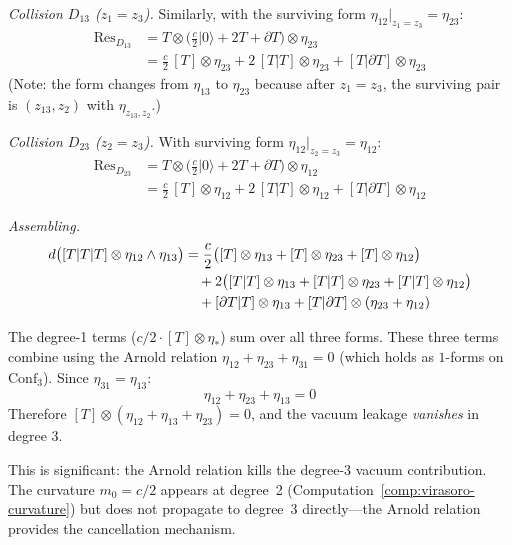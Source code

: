 \begin{computation}
\emph{Collision $D_{13}$ ($z_1 = z_3$).}
Similarly, with the surviving form $\eta_{12}|_{z_1=z_3} = \eta_{23}$:
\begin{align*}
\operatorname{Res}_{D_{13}} &= T \otimes \bigl(\tfrac{c}{2}|0\rangle + 2T + \partial T\bigr)
\otimes \eta_{23} \\
&= \frac{c}{2}\,[T] \otimes \eta_{23}
+ 2\,[T|T] \otimes \eta_{23}
+ [T|\partial T] \otimes \eta_{23}
\end{align*}
(Note: the form changes from $\eta_{13}$ to $\eta_{23}$ because after
$z_1 = z_3$, the surviving pair is $(z_{13}, z_2)$ with $\eta_{z_{13},z_2}$.)

\emph{Collision $D_{23}$ ($z_2 = z_3$).}
With surviving form $\eta_{12}|_{z_2=z_3} = \eta_{12}$:
\begin{align*}
\operatorname{Res}_{D_{23}} &= T \otimes \bigl(\tfrac{c}{2}|0\rangle + 2T + \partial T\bigr)
\otimes \eta_{12} \\
&= \frac{c}{2}\,[T] \otimes \eta_{12}
+ 2\,[T|T] \otimes \eta_{12}
+ [T|\partial T] \otimes \eta_{12}
\end{align*}

\emph{Assembling.}
\begin{align}
d\bigl([T|T|T] \otimes \eta_{12}\wedge\eta_{13}\bigr)
&= \frac{c}{2}\bigl([T] \otimes \eta_{13}
+ [T] \otimes \eta_{23}
+ [T] \otimes \eta_{12}\bigr) \notag \\
&\quad + 2\bigl([T|T] \otimes \eta_{13}
+ [T|T] \otimes \eta_{23}
+ [T|T] \otimes \eta_{12}\bigr) \notag \\
&\quad + [\partial T|T] \otimes \eta_{13}
+ [T|\partial T] \otimes (\eta_{23} + \eta_{12})
\label{eq:vir-deg3-TTT}
\end{align}

The degree-1 terms ($c/2 \cdot [T] \otimes \eta_*$) sum over all three
forms.  These three terms combine using the Arnold relation
$\eta_{12} + \eta_{23} + \eta_{31} = 0$ (which holds as $1$-forms on
$\mathrm{Conf}_3$).  Since $\eta_{31} = \eta_{13}$:
\[
\eta_{12} + \eta_{23} + \eta_{13} = 0
\]
Therefore $[T] \otimes (\eta_{12} + \eta_{13} + \eta_{23}) = 0$, and
the vacuum leakage \emph{vanishes} in degree 3.

This is significant: the Arnold relation kills the degree-3 vacuum
contribution.  The curvature $m_0 = c/2$ appears at degree~2
(Computation~\ref{comp:virasoro-curvature}) but does not propagate
to degree~3 directly---the Arnold relation provides the
cancellation mechanism.


\end{computation}
